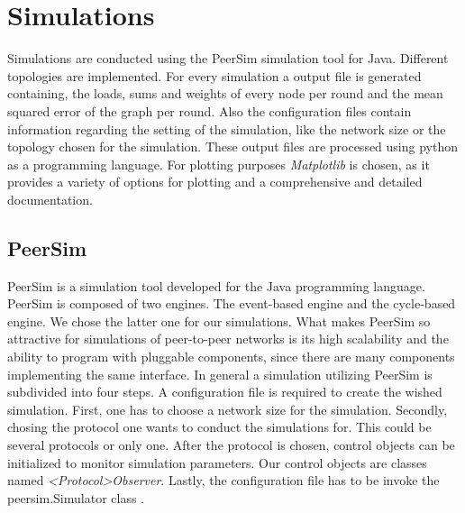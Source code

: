 \chapter{Simulations}\label{chap:simulations}
Simulations are conducted using the PeerSim simulation tool for Java. Different topologies are implemented. For every simulation a output file is generated containing, the loads, sums and weights of every node per round and the mean squared error of the graph per round. Also the configuration files contain information regarding the setting of the simulation, like the network size or the topology chosen for the simulation. These output files are processed using python as a programming language. For plotting purposes \textit{Matplotlib} is chosen, as it provides a variety of options for plotting and a comprehensive and detailed documentation.

\section{PeerSim}
PeerSim is a simulation tool developed for the Java programming language. PeerSim is composed of two engines. The event-based engine and the cycle-based engine. We chose the latter one for our simulations. What makes PeerSim so attractive for simulations of peer-to-peer networks is its high scalability and the ability to program with pluggable components, since there are many components implementing the same interface. In general a simulation utilizing PeerSim is subdivided into four steps. A configuration file is required to create the wished simulation. First, one has to choose a network size for the simulation. Secondly, chosing the protocol one wants to conduct the simulations for. This could be several protocols or only one. After the protocol is chosen, control objects can be initialized to monitor simulation parameters. Our control objects are classes named \textit{<Protocol>Observer}. Lastly, the configuration file has to be invoke the peersim.Simulator class \cite{peersimdocs}. 

